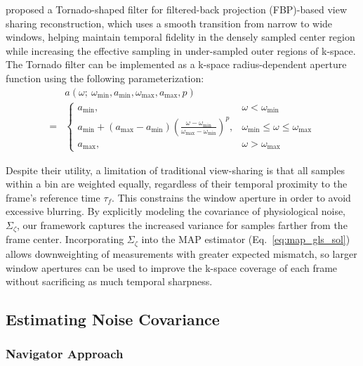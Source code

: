 \documentclass[11pt]{article}
\begin{document}
\cite{barger_2002} proposed a Tornado-shaped filter for filtered-back projection (FBP)-based view sharing reconstruction, which uses a smooth transition from narrow to wide windows, helping maintain temporal fidelity in the densely sampled center region while increasing the effective sampling in under-sampled outer regions of k-space.
The Tornado filter can be implemented as a k-space radius-dependent aperture function using the following parameterization:
\begin{equation*}
    \begin{aligned}
        &a(\omega;\ \omega_\mathrm{min},a_\mathrm{min},\omega_\mathrm{max},a_\mathrm{max},p) \\
        = &\begin{cases}
            a_\mathrm{min}, & \omega < \omega_\mathrm{min} \\
            a_\mathrm{min} + (a_\mathrm{max}-a_\mathrm{min}) \left(\frac{\omega - \omega_\mathrm{min}}{\omega_\mathrm{max} - \omega_\mathrm{min}}\right)^p, & \omega_\mathrm{min} \leq \omega \leq \omega_\mathrm{max} \\
            a_\mathrm{max}, & \omega > \omega_\mathrm{max}
        \end{cases}
    \end{aligned}
\end{equation*}

Despite their utility, a limitation of traditional view-sharing is that all samples within a bin are weighted equally, regardless of their temporal proximity to the frame’s reference time $\tau_f$.
This constrains the window aperture in order to avoid excessive blurring.
By explicitly modeling the covariance of physiological noise, $\Sigma_\zeta$, our framework captures the increased variance for samples farther from the frame center.
Incorporating $\Sigma_\zeta$ into the MAP estimator (Eq.~\ref{eq:map_gls_sol}) allows downweighting of measurements with greater expected mismatch, so larger window apertures can be used to improve the k-space coverage of each frame without sacrificing as much temporal sharpness.

\subsection{Estimating Noise Covariance} \label{sec:estimating_noise_covariance}

\subsubsection{Navigator Approach}
\end{document}
